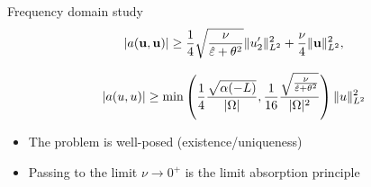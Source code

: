 \begin{frame}{Frequency domain study}
\[
|a({\bf u},{\bf u})| \geq \frac{1}{4} \sqrt{\frac{\nu}{{\hat{{\bf \varepsilon}}} + \theta^2}}\|u_2'\|^2_{L^2} +  \frac{\nu}{4} \|{\bf u}\|_{L^2}^2,
\]

\[
|a(u,u)| \geq \min\left(\frac{1}{4} \frac{\sqrt{\alpha(-L)}}{|\Omega|} , \frac{1}{16}\frac{\sqrt{\frac{\nu}{{\hat{{\bf \varepsilon}}} + \theta^2}}}{|\Omega|^2}\right) \|u\|^2_{L^2}
\]
\begin{block}{}
\begin{itemize}
\item The problem is well-posed (existence/uniqueness)
\item Passing to the limit $\nu \rightarrow 0^+$ is the limit absorption principle
\end{itemize}
\end{block}
\end{frame}

